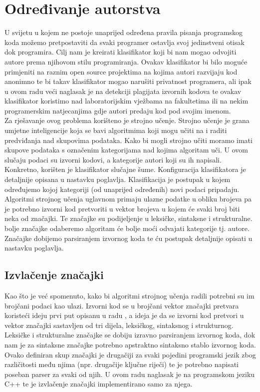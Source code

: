 \chapter{Određivanje autorstva}
U svijetu u kojem ne postoje unaprijed određena pravila pisanja programskog koda možemo pretpostaviti da svaki programer ostavlja svoj jedinstveni otisak dok programira. Cilj nam je kreirati klasifikator koji bi nam mogao odvojiti autore prema njihovom stilu programiranja. Ovakav klasifikator bi bilo moguće primjeniti na raznim open source projektima na kojima autori razvijaju kod anonimno te bi takav klasifikator mogao narušiti privatnost programera, ali ipak u ovom radu veći naglasak je na detekciji plagijata izvornih kodova te ovakav klasifikator koristimo nad laboratorijskim vježbama na fakultetima ili na nekim programerskim natjecanjima gdje autori predaju kod pod svojim imenom. \\

	Za rješavanje ovog problema korišteno je strojno učenje. Strojno učenje je grana umjetne inteligencije koja se bavi algoritmima koji mogu učiti na i raditi predviđanja nad skupovima podataka. Kako bi mogli strojno učiti moramo imati skupove podataka s označenim kategorijama nad kojima algoritam uči. U ovom slučaju podaci su izvorni kodovi, a kategorije autori koji su ih napisali. Konkretno, korišten je klasifikator slučajne šume. Konfiguracija klasifikatora je detaljnije opisana u nastavku poglavlja. Klasifikacija je postupak u kojem određujemo kojoj kategoriji (od unaprijed određenih) novi podaci pripadaju. Algoritmi strojnog učenja uglavnom primaju ulazne podatke u obliku brojeva pa je potrebno izvorni kod pretvoriti u vektor brojeva u kojem će svaki broj biti neka od značajki. Te značajke su podijeljenje u leksičke, sintaksne i strukturalne. 
\newpage
{}
 bolje značajke odaberemo algoritam će bolje moći odvajati kategorije tj. autore. Značajke dobijemo parsiranjem izvornog koda te ću postupak detaljnije opisati u nastavku poglavlja.

\section{Izvlačenje značajki}
Kao što je već spomenuto, kako bi algoritmi strojnog učenja radili potrebni su im brojčani podaci kao ulazi. Izvorni kod se u brojčani vektor značajki pretvara koristeći ideju prvi put opisanu u radu \cite{islam}, a ideja je da se izvorni kod pretvori u vektor značajki sastavljen od tri dijela, leksičkog, sintaksnog i strukturnog. Leksičke i strukturalne značajke se dobiju izravno parsiranjem izvornog koda, dok nam je za sintaksne značajke potrebno apstraktno sintaksno stablo izvornog koda. Ovako definiran skup značajki je drugačiji za svaki pojedini programski jezik zbog različitosti među njima (npr. drugačije ključne riječi) te je potrebno napisati poseban parser za svaki od njih. U ovom radu naglasak je na programskom jeziku C++ te je izvlačenje značajki implementirano samo za njega. \\

